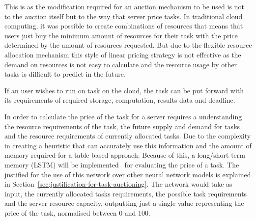 This is as the modification required for an auction mechanism to be used is not to the auction itself but to the way
that server price tasks. In traditional cloud computing, it was possible to create combinations of resources that means
that users just buy the minimum amount of resources for their task with the price determined by the amount of
resources requested. But due to the flexible resource allocation mechanism this style of linear pricing strategy is not
effective as the demand on resources is not easy to calculate and the resource usage by other tasks is difficult to
predict in the future.

If an user wishes to run on task on the cloud, the task can be put forward with its
requirements of required storage, computation, results data and deadline.


In order to calculate the price of the task for a server requires a understanding the resource requirements of the task,
the future supply and demand for tasks and the resource requirements of currently allocated tasks. Due to the complexity
in creating a heuristic that can accurately use this information and the amount of memory required for a table based
approach. Because of this, a long/short term memory (LSTM) will be implemented~\citep{LSTM}  for evaluating the price
of a task. The justified for the use of this network over other neural network models is explained in
Section~\ref{sec:justification-for-task-auctioning}. The network would take as input, the currently
allocated tasks requirements, the possible task requirements and the server resource capacity, outputting just a single
value representing the price of the task, normalised between 0 and 100.

